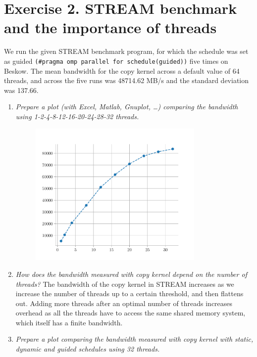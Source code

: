 \documentclass[12pt]{article}
\begin{document}
\section{Exercise 2. STREAM benchmark and the importance of threads}
We run the given STREAM benchmark program, for which the schedule was set as guided \texttt{(\#pragma omp parallel for schedule(guided))} five times on Beskow. The mean bandwidth for the copy kernel across a default value of 64 threads, and across the five runs was 48714.62 MB/s and the standard deviation was 137.66.
	\begin{enumerate}
		\item \textit{Prepare a plot (with Excel, Matlab, Gnuplot, …) comparing the bandwidth using 1-2-4-8-12-16-20-24-28-32 threads.}
		
		\begin{figure}[H]
			\includegraphics[width=0.8\textwidth]{stream.pdf}
		\end{figure}
		\item \textit{How does the bandwidth measured with copy kernel depend on the number of threads?}
		The bandwidth of the copy kernel in STREAM increases as we increase the number of threads up to a certain threshold, and then flattens out. Adding more threads after an optimal number of threads increases overhead as all the threads have to access the same shared memory system, which itself has a finite bandwidth.
		\item \textit{Prepare a plot comparing the bandwidth measured with copy kernel with static, dynamic and guided schedules using 32 threads.}
		\begin{figure}[H]

\end{figure}
\end{enumerate}
\end{document}
